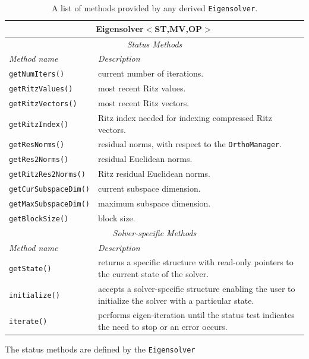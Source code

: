 \documentclass[acmtoms]{acmtrans2m}
\newcommand{\aspace}[1]{\texttt{#1}}
\begin{document}
\begin{table}[htp]
\begin{center}
\caption{A list of methods provided by any derived \aspace{Eigensolver}.} 
\label{tab:anasazi:itermethods}
\begin{tabular}{| p{3cm} | p{6cm} |}
\hline
\multicolumn{2}{|c|}{\textbf{Eigensolver$<$ST,MV,OP$>$}} \\\hline
\multicolumn{2}{|c|}{\emph{Status Methods}} \\
\hline
\emph{Method name} & \emph{Description} \\
\hline
{\tt getNumIters()}       & current number of iterations. \\
{\tt getRitzValues()}     & most recent Ritz values. \\
{\tt getRitzVectors()}    & most recent Ritz vectors. \\
{\tt getRitzIndex()}      & Ritz index needed for indexing compressed Ritz vectors. \\
{\tt getResNorms()}       & residual norms, with respect to the \aspace{OrthoManager}. \\
{\tt getRes2Norms()}      & residual Euclidean norms. \\
{\tt getRitzRes2Norms()}  & Ritz residual  Euclidean norms. \\
{\tt getCurSubspaceDim()} & current subspace dimension. \\
{\tt getMaxSubspaceDim()} & maximum subspace dimension. \\
{\tt getBlockSize()}      & block size. \\
\hline
\multicolumn{2}{|c|}{\emph{Solver-specific Methods}} \\
\hline
\emph{Method name} & \emph{Description} \\
\hline
{\tt getState()}       & returns a specific structure with read-only pointers to
                       the current state of the solver. \\
{\tt initialize()}     & accepts a solver-specific structure enabling the user to initialize
                       the solver with a particular state.\\
{\tt iterate()}        & performs eigen-iteration until the status test indicates the need
                       to stop or an error occurs.\\
\hline
\end{tabular}
\end{center}
\end{table}
The status methods are defined by the \aspace{Eigensolver}
\end{document}
